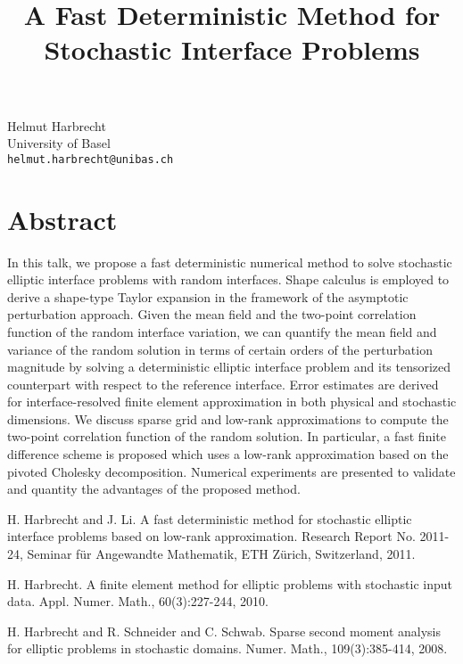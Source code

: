 \title{A Fast Deterministic Method for Stochastic Interface Problems}
 \author{} \institute{}
\maketitle
\begin{center}
{\large Helmut Harbrecht}\\
University of Basel\\
{\tt helmut.harbrecht@unibas.ch}

\end{center}

\section*{Abstract}

In this talk, we propose a fast deterministic numerical method to solve stochastic elliptic interface problems with random interfaces. Shape calculus is employed to derive a shape-type Taylor expansion in the framework of the asymptotic perturbation approach. Given the mean field and the two-point correlation function of the random interface variation, we can quantify the mean field and variance of the random solution in terms of certain orders of the perturbation magnitude by solving a deterministic elliptic interface problem and its tensorized counterpart with respect to the reference interface. Error estimates are derived for interface-resolved finite element approximation in both physical and stochastic dimensions. We discuss sparse grid and low-rank approximations to compute the two-point correlation function of the random solution. In particular, a fast finite difference scheme is proposed which uses a low-rank approximation based on the pivoted Cholesky decomposition. Numerical experiments are presented to validate and quantity the advantages of the proposed method.


\begin{thebibliography}{10}

{\sc H. Harbrecht and J. Li}. {A fast deterministic method for stochastic elliptic interface problems based on low-rank approximation}. Research Report No. 2011-24, Seminar f\"ur Angewandte Mathematik, ETH Z\"urich, Switzerland, 2011.



{\sc H. Harbrecht}. {A finite element method for elliptic problems with stochastic input data}. Appl. Numer. Math., 60(3):227-244, 2010.



{\sc H. Harbrecht and R. Schneider and C. Schwab}. {Sparse second moment analysis for elliptic problems in stochastic domains}. Numer. Math., 109(3):385-414, 2008.

\end{thebibliography}
